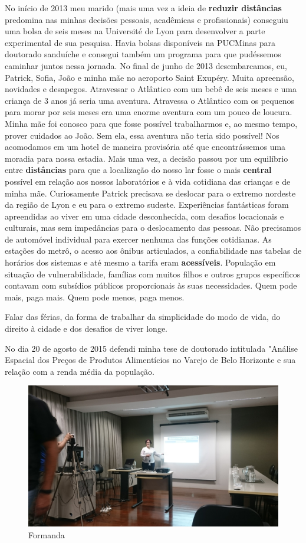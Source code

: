 \documentclass[
]{book}
\begin{document}
No início de 2013 meu marido (mais uma vez a ideia de \textbf{reduzir distâncias} predomina nas minhas decisões pessoais, acadêmicas e profissionais) conseguiu uma bolsa de seis meses na Université de Lyon para desenvolver a parte experimental de sua pesquisa. Havia bolsas disponíveis na PUCMinas para doutorado sanduíche e consegui também um programa para que pudéssemos caminhar juntos nessa jornada. No final de junho de 2013 desembarcamos, eu, Patrick, Sofia, João e minha mãe no aeroporto Saint Exupéry. Muita apreensão, novidades e desapegos. Atravessar o Atlântico com um bebê de seis meses e uma criança de 3 anos já seria uma aventura. Atravessa o Atlântico com os pequenos para morar por seis meses era uma enorme aventura com um pouco de loucura. Minha mãe foi conosco para que fosse possível trabalharmos e, ao mesmo tempo, prover cuidados ao João. Sem ela, essa aventura não teria sido possível! Nos acomodamos em um hotel de maneira provisória até que encontrássemos uma moradia para nossa estadia. Mais uma vez, a decisão passou por um equilíbrio entre \textbf{distâncias} para que a localização do nosso lar fosse o mais \textbf{central} possível em relação aos nossos laboratórios e à vida cotidiana das crianças e de minha mãe. Curiosamente Patrick precisava se deslocar para o extremo nordeste da região de Lyon e eu para o extremo sudeste. Experiências fantásticas foram apreendidas ao viver em uma cidade desconhecida, com desafios locacionais e culturais, mas sem impedâncias para o deslocamento das pessoas. Não precisamos de automóvel individual para exercer nenhuma das funções cotidianas. As estações do metrô, o acesso aos ônibus articulados, a confiabilidade nas tabelas de horários dos sistemas e até mesmo a tarifa eram \textbf{acessíveis}. População em situação de vulnerabilidade, famílias com muitos filhos e outros grupos específicos contavam com subsídios públicos proporcionais às suas necessidades. Quem pode mais, paga mais. Quem pode menos, paga menos.

Falar das férias, da forma de trabalhar da simplicidade do modo de vida, do direito à cidade e dos desafios de viver longe.

No dia 20 de agosto de 2015 defendi minha tese de doutorado intitulada "Análise Espacial dos Preços de Produtos Alimentícios no Varejo de Belo Horizonte e sua relação com a renda média da população.

\begin{figure}
\includegraphics[width=1\linewidth]{img/defesa} \caption{Formanda}\label{fig:defesa}
\end{figure}
\end{document}
